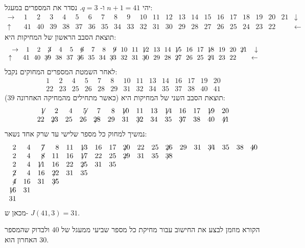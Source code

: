 \begin{example}
יהי
$n+1=41$
ו-%
$q=3$.
נסדר את המספרים במעגל:
\[
\begin{array}{rrrrrrrrrrrrrrrrrrrrrrr}
\rightarrow\!&\!1\!&\!2\!&\!3\!&\!4\!&\!5\!&\!6\!&\!7\!&\!8\!&\!9\!&\!10\!&\!
           11\!&\!12\!&\!13\!&\!14\!&\!15\!&\!16\!&\!17\!&\!18\!&\!19\!&\!20\!&\!21\!&\!
\downarrow\\
\uparrow\quad\!&\!41\!&\!40\!&\!39\!&\!38\!&\!37\!&\!36\!&\!35\!&\!34\!&\!33\!&\!
32\!&\!31\!&\!30\!&\!29\!&\!28\!&\!27\!&\!26\!&\!25\!&\!24\!&\!23\!&\!22\!&\!
&\leftarrow
\end{array}
\]
תוצאת הסבב הראשון של המחיקות היא:
\[
\begin{array}{rrrrrrrrrrrrrrrrrrrrrrr}
\rightarrow\!&\!1\!&\!2\!&\!\not\! 3\!&\!4\!&\!5\!&\!\not\! 6\!&\!7\!&\!8\!&\!\not\! 9\!&\!10\!&\!
           11\!&\!\not\!\! 12\!&\!13\!&\!14\!&\!\not\!\! 15\!&\!16\!&\!17\!&\!\not\!\! 18\!&\!19\!&\!20\!&\!\not\!\! 21\!&\!
\downarrow\\
	\uparrow\quad\!&\!41\!&\!40\!&\!\not\!\! 39\!&\!38\!&\!37\!&\!\not\!\! 36\!&\!35\!&\!34\!&\!\not\!\! 33\!&\!
32\!&\!31\!&\!\not\!\! 30\!&\!29\!&\!28\!&\!\not\!\! 27\!&\!26\!&\!25\!&\!\not\!\! 24\!&\!23\!&\!22\!&\!
\!&\!\leftarrow
\end{array}
\]
לאחר השמטת המספרים המחוקים נקבל:
\[
\begin{array}{rrrrrrrrrrrrrrrrrrrrrrrrrrrr}
1&2&4&5&7&8&10&11&13&14&16&17&19&20\\
22&23&25&26&28&29&31&32&34&35&37&38&40&41
\end{array}
\]
תוצאת הסבב השני של המחיקות היא (כאשר מתחילים מהמחיקה האחרונה
$39$):
\[
\begin{array}{rrrrrrrrrrrrrrrrrrrrrrrrrrrr}
\not\!\! 1&2&4&\not\!\! 5&7&8&\not\!\! 10&11&13&\not\!\! 14&16&17&\not\!\! 19&20\\
22&\not\!\! 23&25&26&\not\!\! 28&29&31&\not\!\! 32&34&35&\not\!\! 37&38&40&\not\!\! 41
\end{array}
\]
נמשיך למחוק כל מספר שלישי עד שרק אחד נשאר:
\[
\begin{array}{rrrrrrrrrrrrrrrrrr}
2&4&\not\!7&8&11&\not\!\!13&16&17&\not\!\!20&22&25&\not\!\!26&29&31&\not\!\!34&35&38&\not\!\!40
\\
2&4&\not\!8&11&16&\not\!\!17&22&25&\not\!\!29&31&35&\not\!\!38
\\
2&4&\not\!\!11&16&22&\not\!\!25&31&35
\\
\not\!2&4&16&\not\!\!22&31&35
\\
\not\!4&16&31&\not\!\!35
\\
\not\!\!16&31
\\
31
\end{array}
\]
מכאן ש-%
$J(41,3)=31$.
\end{example}
הקורא מוזמן לבצע את החישוב עבור מחיקת כל מספר שביעי ממעגל של 
$40$
ולבדוק שהמספר האחרון הוא
$30$.

